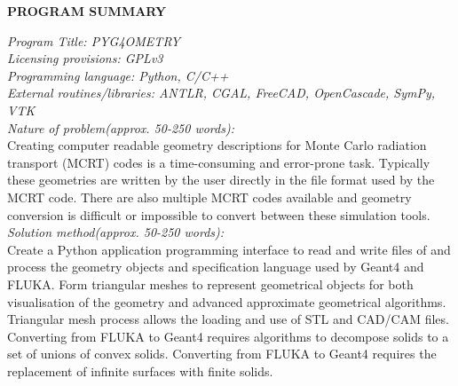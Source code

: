 \documentclass[final,5p,times,twocolumn]{elsarticle}
\begin{document}


\linenumbers

{\bf PROGRAM SUMMARY}

\begin{small}
\noindent
{\em Program Title: PYG4OMETRY }                                         		\\
{\em Licensing provisions: GPLv3 }							\\
{\em Programming language: Python, C/C++}                         		\\
{\em External routines/libraries: ANTLR, CGAL, FreeCAD, OpenCascade, SymPy, VTK}           	\\


{\em Nature of problem(approx. 50-250 words):}\\
Creating computer readable geometry descriptions for Monte Carlo radiation transport (MCRT) codes is a time-consuming and error-prone task. 
Typically these geometries are written by the user directly in the file format used by the MCRT code. There are also multiple MCRT codes 
available and geometry conversion is difficult or impossible to convert between these simulation tools. 
\\
{\em Solution method(approx. 50-250 words):}\\
Create a Python application programming interface to read and write files of and process the geometry objects and specification 
language used by Geant4 and FLUKA. Form triangular meshes to represent geometrical objects for both visualisation of the 
geometry and advanced approximate geometrical algorithms. Triangular mesh process allows the loading and use of STL and CAD/CAM 
files. Converting from FLUKA to Geant4 requires algorithms to decompose solids to a set of unions of convex solids. Converting from 
FLUKA to Geant4 requires the replacement of infinite surfaces with finite solids. 
 

\end{small}
\end{document}
